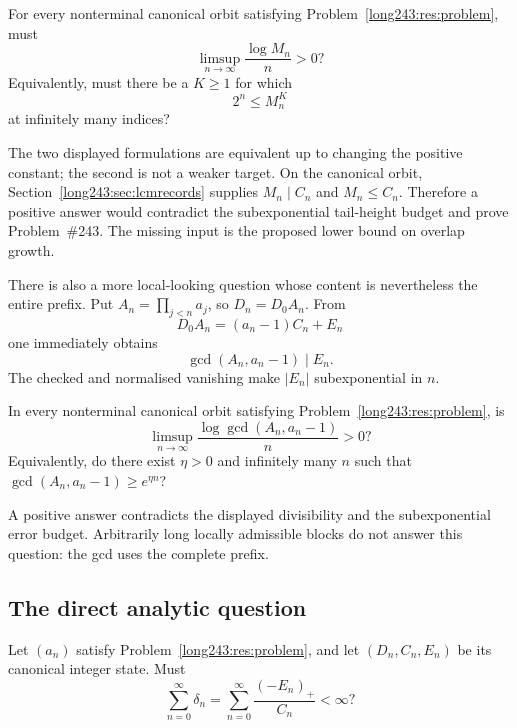 \begin{problem}\label{long243:res:lcmheight}
For every nonterminal canonical orbit satisfying Problem~\ref{long243:res:problem},
must
\[
 \limsup_{n\to\infty}\frac{\log M_n}{n}>0?
\]
Equivalently, must there be a $K\ge1$ for which
\[
 2^n\le M_n^K
\]
at infinitely many indices?
\end{problem}

\noindent The two displayed formulations are equivalent up to changing the
positive constant; the second is not a weaker target. On the canonical orbit,
Section~\ref{long243:sec:lcmrecords} supplies $M_n\mid C_n$ and $M_n\le C_n$.
Therefore a positive answer would contradict the subexponential tail-height
budget and prove Problem~\#243. The missing input is the proposed lower
bound on overlap growth.

There is also a more local-looking question whose content is nevertheless the
entire prefix.  Put $A_n=\prod_{j<n}a_j$, so $D_n=D_0A_n$.  From
\[
 D_0A_n=(a_n-1)C_n+E_n
\]
one immediately obtains
\[
 \gcd(A_n,a_n-1)\mid E_n.
\]
The checked
and normalised vanishing make $|E_n|$ subexponential in $n$.

\begin{problem}\label{long243:res:prefixgcd}
In every nonterminal canonical orbit satisfying Problem~\ref{long243:res:problem}, is
\[
 \limsup_{n\to\infty}
 \frac{\log\gcd(A_n,a_n-1)}{n}>0?
\]
Equivalently, do there exist $\eta>0$ and infinitely many $n$ such that
$\gcd(A_n,a_n-1)\ge e^{\eta n}$?
\end{problem}

\noindent A positive answer contradicts the displayed divisibility and the
subexponential error budget.  Arbitrarily long locally admissible blocks do
not answer this question: the gcd uses the complete prefix.

\subsection{The direct analytic question}

\begin{problem}\label{long243:res:masshyp}
Let $(a_n)$ satisfy Problem~\ref{long243:res:problem}, and let $(D_n,C_n,E_n)$ be its
canonical integer state.  Must
\[
 \sum_{n=0}^{\infty}\delta_n
 =\sum_{n=0}^{\infty}\frac{(-E_n)_+}{C_n}<\infty ?
\]
\end{problem}

